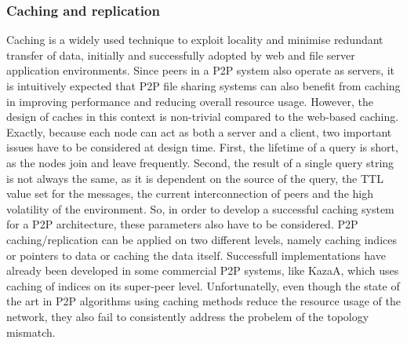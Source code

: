 \subsubsection{Caching and replication}
Caching is a widely used technique to exploit locality and minimise redundant
transfer of data, initially and successfully adopted by web and file server
application environments. Since peers in a P2P system also operate as
servers, it is intuitively expected that P2P file sharing systems can also
benefit from caching in improving performance and reducing overall resource
usage. However, the design of caches in this context is non-trivial compared to
the web-based caching. Exactly, because each node can act as both a server and a
client, two important issues have to be considered at design time. First, the
lifetime of a query is short, as the nodes join and leave frequently. Second,
the result of a single query string is not always the same, as it is dependent
on the source of the query, the TTL value set for the messages, the current
interconnection of peers and the high volatility of the environment. So, in
order to develop a successful caching system for a P2P architecture, these
parameters also have to be considered. P2P caching/replication can be applied
on two different levels, namely caching indices or pointers to data or caching
the data itself. Successfull implementations have already been developed in
some commercial P2P systems, like KazaA, which uses caching of indices on its
super-peer level. Unfortunatelly, even though the state of the art in P2P
algorithms using caching methods reduce the resource usage of the network, they
also fail to consistently address the probelem of the topology mismatch.

%

